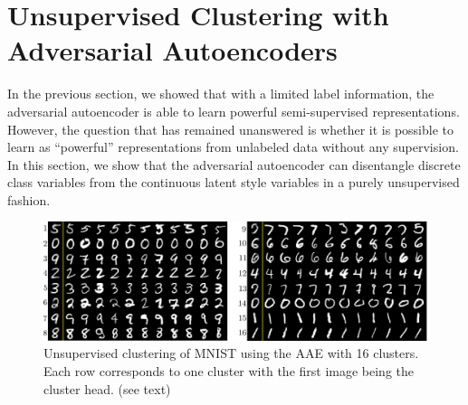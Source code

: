 \documentclass{article}
\begin{document}
\section{Unsupervised Clustering with Adversarial Autoencoders}
In the previous section, we showed that with a limited label information, the adversarial autoencoder is able to learn powerful semi-supervised representations. However, the question that has remained unanswered is whether it is possible to learn as ``powerful'' representations from unlabeled data without any supervision. In this section, we show that the adversarial autoencoder can disentangle discrete class variables from the continuous latent style variables in a purely unsupervised fashion. 

\begin{figure}[b]
\begin{center}
\centering 
\includegraphics[scale=.28]{cluster_number}
\caption{\label{fig:cluster}Unsupervised clustering of MNIST using the AAE with 16 clusters. Each row corresponds to one cluster with the first image being the cluster head. (see text)}
\end{center}
\end{figure}
\end{document}
